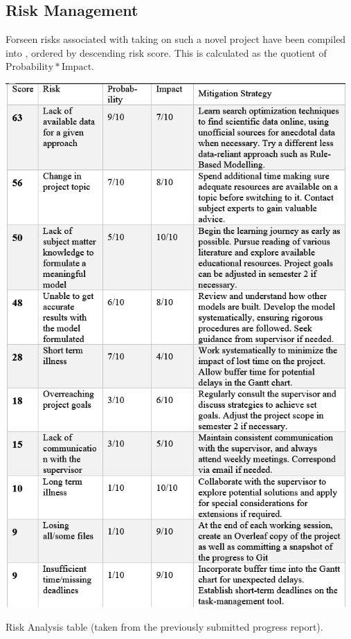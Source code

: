 \subsection{Risk Management}

Forseen risks associated with taking on such a novel project have been compiled into , ordered by descending risk score. This is calculated as the quotient of $\mathrm{Probability * Impact}$.

\begin{table}[!htb]
    \includegraphics[width=13cm,center]{Figures/RiskTable2.png}
    \caption{Risk Analysis table (taken from the previously submitted progress report).}
    \label{Figure:RiskTable}
\end{table}